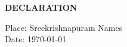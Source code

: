 \begin{titlepage}
\begin{center}
    \Large{\textbf{DECLARATION}}
\end{center}



\noindent Place: Sreekrishnapuram \hfill Names\\
Date: \today \hfill 

\end{titlepage}
